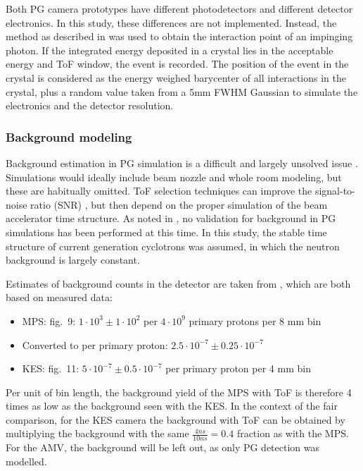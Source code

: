 \documentclass[a4paper,english]{article}
\begin{document}
Both PG camera prototypes have different photodetectors and different detector electronics. In this study, these differences are not implemented. Instead, the method as described in \cite{Gueth2013} was used to obtain the interaction point of an impinging photon. If the integrated energy deposited in a crystal lies in the acceptable energy and ToF window, the event is recorded. The position of the event in the crystal is considered as the energy weighed barycenter of all interactions in the crystal, plus a random value taken from a 5mm FWHM Gaussian to simulate the electronics and the detector resolution.

\subsubsection{Background modeling}

Background estimation in PG simulation is a difficult and largely unsolved issue \citep{Huisman2016,Sterpin2015,Pinto2014a,Perali2014}. Simulations would ideally include beam nozzle and whole room modeling, but these are habitually omitted. ToF selection techniques can improve the signal-to-noise ratio (SNR) \citep{Testa2008,Roellinghoff2014a}, but then depend on the proper simulation of the beam accelerator time structure. As noted in \cite{Huisman2016}, no validation for background in PG simulations has been performed at this time. In this study, the stable time structure of current generation cyclotrons was assumed, in which the neutron background is largely constant. 

Estimates of background counts in the detector are taken from \cite{Pinto2014a,Perali2014}, which are both based on measured data:

\begin{itemize}[noitemsep]
\item MPS: \cite{Pinto2014a} fig.~9: $1 \cdot 10^{3} \pm 1 \cdot 10^{2}$ per $4\cdot10^9$ primary protons per 8 mm bin
\item[] Converted to per primary proton: $2.5 \cdot 10^{-7} \pm 0.25 \cdot 10^{-7}$
\item KES: \cite{Perali2014} fig.~11: $5 \cdot 10^{-7} \pm 0.5 \cdot 10^{-7}$ per primary proton per 4 mm bin
\end{itemize}

Per unit of bin length, the background yield of the MPS with ToF is therefore 4 times as low as the background seen with the KES. In the context of the fair comparison, for the KES camera the background with ToF can be obtained by multiplying the background with the same $\frac{4 ns}{10 ns} = 0.4$ fraction as with the MPS. For the AMV, the background will be left out, as only PG detection was modelled.
\end{document}
